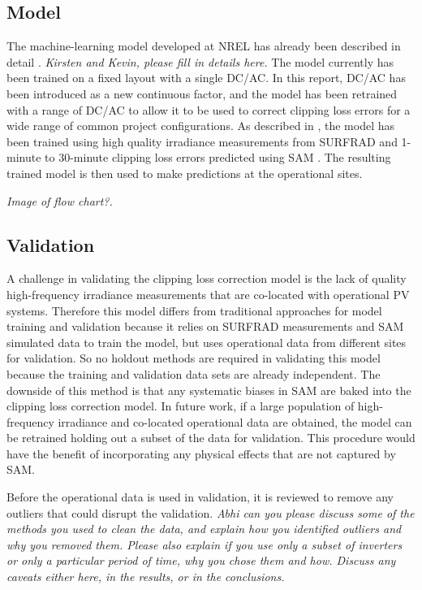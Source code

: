 \documentclass[conference]{IEEEtran}
\begin{document}
\subsection{Model}

The machine-learning model developed at NREL has already been described in detail \cite{Anderson2020}. \textit{\color{red}Kirsten and Kevin, please fill in details here.} The model currently has been trained on a fixed layout with a single DC/AC. In this report, DC/AC has been introduced as a new continuous factor, and the model has been retrained with a range of DC/AC to allow it to be used to correct clipping loss errors for a wide range of common project configurations. As described in \cite{Anderson2020}, the model has been trained using high quality irradiance measurements from SURFRAD \cite{Augustine2000} and 1-minute to 30-minute clipping loss errors predicted using SAM \cite{Freeman2018}. The resulting trained model is then used to make predictions at the operational sites.

\textit{\color{red}Image of flow chart?.}

\subsection{Validation}
A challenge in validating the clipping loss correction model is the lack of quality high-frequency irradiance measurements that are co-located with operational PV systems. Therefore this model differs from traditional approaches for model training and validation because it relies on SURFRAD measurements and SAM simulated data to train the model, but uses operational data from different sites for validation. So no holdout methods are required in validating this model because the training and validation data sets are already independent. The downside of this method is that any systematic biases in SAM are baked into the clipping loss correction model. In future work, if a large population of high-frequency irradiance and co-located operational data are obtained, the model can be retrained holding out a subset of the data for validation. This procedure would have the benefit of incorporating any physical effects that are not captured by SAM.

Before the operational data is used in validation, it is reviewed to remove any outliers that could disrupt the validation. \textit{\color{red}Abhi can you please discuss some of the methods you used to clean the data, and explain how you identified outliers and why you removed them. Please also explain if you use only a subset of inverters or only a particular period of time, why you chose them and how. Discuss any caveats either here, in the results, or in the conclusions.}
\end{document}
